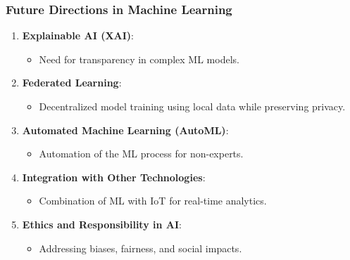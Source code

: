 \documentclass[aspectratio=169]{beamer}
\begin{document}
\begin{frame}[fragile]
    \frametitle{Future Directions in Machine Learning}
    \begin{enumerate}
        \item \textbf{Explainable AI (XAI)}:
        \begin{itemize}
            \item Need for transparency in complex ML models.
        \end{itemize}
        
        \item \textbf{Federated Learning}:
        \begin{itemize}
            \item Decentralized model training using local data while preserving privacy.
        \end{itemize}

        \item \textbf{Automated Machine Learning (AutoML)}:
        \begin{itemize}
            \item Automation of the ML process for non-experts.
        \end{itemize}

        \item \textbf{Integration with Other Technologies}:
        \begin{itemize}
            \item Combination of ML with IoT for real-time analytics.
        \end{itemize}

        \item \textbf{Ethics and Responsibility in AI}:
        \begin{itemize}
            \item Addressing biases, fairness, and social impacts.
        \end{itemize}
    \end{enumerate}
\end{frame}
\end{document}
